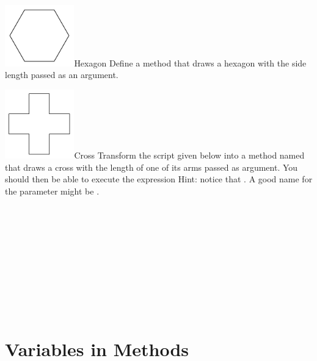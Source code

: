 \documentclass[a4paper,10pt,twoside]{book}
\begin{document}
\begin{exofigwithsizeandtitle}[0.5]{\includegraphics[width=3cm]{ArgHexagon}}{Hexagon}
Define a method  that draws a hexagon with the side length passed as an argument. 
\end{exofigwithsizeandtitle}




\begin{exofigwithsizeandtitle}[0.65]{\includegraphics[width=3cm]{Argcrossscr}}{Cross}
Transform the script given below into a method named  that draws a cross with the length of one of its 
arms passed as argument. You should then be able to execute the expression  Hint: notice 
that . A good name for the parameter might be . 

 \\
 \\
\\
    \ct{     [ pica go: 50.} \\
     \\
     \\
     \\
    \\
    \\
    \ct{     pica go: 50 ]}
\end{exofigwithsizeandtitle}


\section{Variables in Methods}
\end{document}
